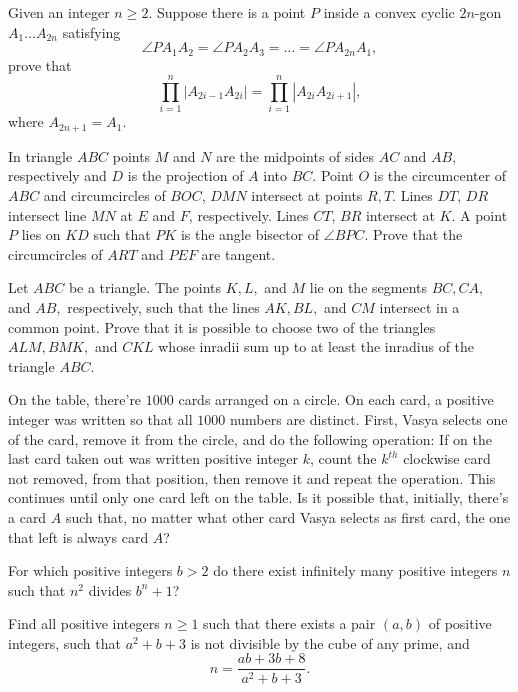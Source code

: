 \documentclass[11pt]{scrartcl}
\begin{document}
\begin{problem}[702587891849077]
	Given an integer $n \geqslant 2$. Suppose there is a point $P$ inside a convex cyclic $2n$-gon $A_1 \ldots A_{2n}$ satisfying$$\angle PA_1A_2 = \angle PA_2A_3 = \ldots = \angle PA_{2n}A_1,$$prove that$$ \prod_{i=1}^{n} \left|A_{2i - 1}A_{2i} \right| = \prod_{i=1}^{n} \left|A_{2i}A_{2i+1} \right|,$$where $A_{2n + 1} = A_1$.
\end{problem}
\begin{problem}[697545974967766]
	In triangle $ABC$ points $M$ and $N$ are the midpoints of sides $AC$ and $AB$, respectively and $D$ is the projection of $A$ into $BC$. Point $O$ is the circumcenter of $ABC$ and circumcircles of $BOC$, $DMN$ intersect at points $R, T$. Lines $DT$, $DR$ intersect line $MN$ at $E$ and $F$, respectively. Lines $CT$, $BR$ intersect at $K$. A point $P$ lies on $KD$ such that $PK$ is the angle bisector of $\angle BPC$. Prove that the circumcircles of $ART$ and $PEF$ are tangent.
\end{problem}
\begin{problem}[8959954456910482516]
Let $ABC$ be a triangle. The points $K, L,$ and $M$ lie on the segments $BC, CA,$ and $AB,$ respectively, such that the lines $AK, BL,$ and $CM$ intersect in a common point. Prove that it is possible to choose two of the triangles $ALM, BMK,$ and $CKL$ whose inradii sum up to at least the inradius of the triangle $ABC$.
\end{problem}
\begin{problem}[1527496195334546428]
On the table, there're $1000$ cards arranged on a circle. On each card, a positive integer was written so that all $1000$ numbers are distinct. First, Vasya selects one of the card, remove it from the circle, and do the following operation: If on the last card taken out was written positive integer $k$, count the $k^{th}$ clockwise card not removed, from that position, then remove it and repeat the operation. This continues until only one card left on the table. Is it possible that, initially, there's a card $A$ such that, no matter what other card Vasya selects as first card, the one that left is always card $A$?
\end{problem}
\begin{problem}[4679791554410865501]
For which positive integers $b > 2$ do there exist infinitely many positive integers $n$ such that $n^2$ divides $b^n+1$?
\end{problem}
\begin{problem}[4375421764909014892]
	Find all positive integers $n\geq1$ such that there exists a pair $(a,b)$ of positive integers, such that $a^2+b+3$ is not divisible by the cube of any prime, and$$n=\frac{ab+3b+8}{a^2+b+3}.$$
\end{problem}
\end{document}
